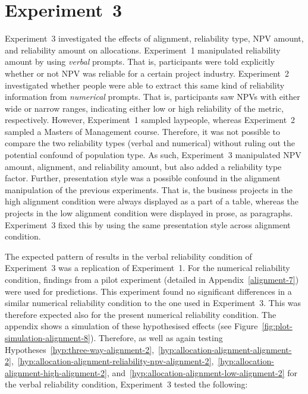 \documentclass[a4paper, nobind, dvipsnames]{templates/ociamthesis}
\theoremstyle{definition}
\theoremstyle{definition}
\theoremstyle{definition}
\theoremstyle{definition}
\theoremstyle{remark}
\begin{document}
\hypertarget{alignment-8}{%
\section{Experiment~3}\label{alignment-8}}

Experiment~3 investigated the effects of alignment, reliability type, NPV
amount, and reliability amount on allocations. Experiment~1 manipulated
reliability amount by using \emph{verbal} prompts. That is, participants were told
explicitly whether or not NPV was reliable for a certain project industry.
Experiment~2 investigated whether people were able to extract this same kind of
reliability information from \emph{numerical} prompts. That is, participants saw NPVs
with either wide or narrow ranges, indicating either low or high reliability of
the metric, respectively. However, Experiment~1 sampled laypeople, whereas
Experiment~2 sampled a Masters of Management course. Therefore, it was not
possible to compare the two reliability types (verbal and numerical) without
ruling out the potential confound of population type. As such, Experiment~3
manipulated NPV amount, alignment, and reliability amount, but also added a
reliability type factor. Further, presentation style was a possible confound in
the alignment manipulation of the previous experiments. That is, the business
projects in the high alignment condition were always displayed as a part of a
table, whereas the projects in the low alignment condition were displayed in
prose, as paragraphs. Experiment~3 fixed this by using the same presentation
style across alignment condition.

The expected pattern of results in the verbal reliability condition of
Experiment~3 was a replication of Experiment~1. For the numerical reliability
condition, findings from a pilot experiment (detailed in
Appendix~\ref{alignment-7}) were used for predictions. This experiment found no
significant differences in a similar numerical reliability condition to the one
used in Experiment~3. This was therefore expected also for the present numerical
reliability condition. The appendix shows a simulation of these hypothesised
effects (see Figure~\ref{fig:plot-simulation-alignment-8}). Therefore, as well
as again testing
Hypotheses~\ref{hyp:three-way-alignment-2},~\ref{hyp:allocation-alignment-alignment-2},~\ref{hyp:allocation-alignment-reliability-npv-alignment-2},~\ref{hyp:allocation-alignment-high-alignment-2},
and~\ref{hyp:allocation-alignment-low-alignment-2} for the verbal reliability
condition, Experiment~3 tested the following:
\end{document}
